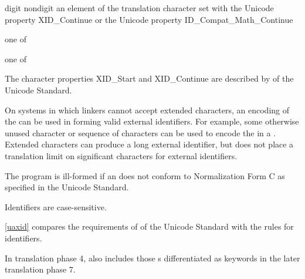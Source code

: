\begin{bnf}
\br
    digit\br
    nondigit\br
    \textnormal%
	{an element of the translation character set with the Unicode property XID_Continue or the Unicode property ID_Compat_Math_Continue}
\end{bnf}

\begin{bnf}
 \textnormal{one of}\br
    \br
    \br
    \br
\end{bnf}

\begin{bnf}
 \textnormal{one of}\br
\end{bnf}

\pnum
{}%
%
\begin{note}
The character properties XID_Start and XID_Continue are described by  of the Unicode Standard.
\begin{footnote}
On systems in which linkers cannot accept extended
characters, an encoding of the  can be used in
forming valid external identifiers. For example, some otherwise unused
character or sequence of characters can be used to encode the
 in a . Extended
characters can produce a long external identifier, but \Cpp{} does not
place a translation limit on significant characters for external
identifiers.
\end{footnote}
\end{note}
The program is ill-formed
if an  does not conform to
Normalization Form C as specified in the Unicode Standard.
\begin{note}
Identifiers are case-sensitive.
\end{note}
\begin{note}
\ref{uaxid} compares the requirements of  of the Unicode Standard
with the \Cpp{} rules for identifiers.
\end{note}
\begin{note}
In translation phase 4,
 also includes
those s
differentiated as keywords
in the later translation phase 7.
\end{note}

